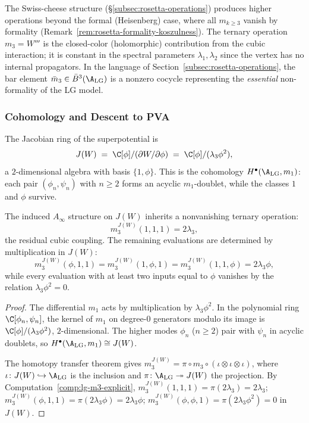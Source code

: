 \begin{remark}
\label{rem:lg-m3-rosetta}
The Swiss-cheese structure (\S\ref{subsec:rosetta-operations}) produces higher operations beyond the formal (Heisenberg) case, where all $m_{k \ge 3}$ vanish by formality (Remark~\ref{rem:rosetta-formality-koszulness}). The ternary operation $m_3 = W'''$ is the closed-color (holomorphic) contribution from the cubic interaction; it is constant in the spectral parameters $\lambda_1,\lambda_2$ since the vertex has no internal propagators. In the language of Section~\ref{subsec:rosetta-operations}, the bar element $\bar{m}_3 \in \bar{B}^3(\A_{\mathrm{LG}})$ is a nonzero cocycle representing the \emph{essential} non-formality of the LG model.
\end{remark}

\subsubsection{Cohomology and Descent to PVA}

\begin{proposition}
\label{prop:LG_cohomology}
The Jacobian ring of the superpotential is
\[
J(W) \;=\; \C[\phi]/(\partial W/\partial\phi)
 \;=\; \C[\phi]/(\lambda_3\phi^2),
\]
a $2$-dimensional algebra with basis $\{1,\phi\}$.
This is the cohomology $H^\bullet(\A_{\mathrm{LG}}, m_1)$: each pair
$(\phi_n,\psi_n)$ with $n \ge 2$ forms an acyclic $m_1$-doublet, while the
classes $1$ and $\phi$ survive.

The induced $A_\infty$ structure on $J(W)$ inherits a nonvanishing ternary
operation:
\begin{equation}\label{eq:lg-jacobian-m3}
 m_3^{J(W)}(1,1,1) = 2\lambda_3,
\end{equation}
the residual cubic coupling. The remaining evaluations are determined by
multiplication in $J(W)$:
\[
m_3^{J(W)}(\phi,1,1)=m_3^{J(W)}(1,\phi,1)=m_3^{J(W)}(1,1,\phi)
=2\lambda_3\phi,
\]
while every evaluation with at least two inputs equal to $\phi$ vanishes by
the relation $\lambda_3\phi^2=0$.
\end{proposition}

\begin{proof}
The differential $m_1$ acts by multiplication by $\lambda_3\phi^2$. In the polynomial ring $\C[\phi_n,\psi_n]$, the kernel of $m_1$ on degree-$0$ generators modulo its image is $\C[\phi]/(\lambda_3\phi^2)$, $2$-dimensional. The higher modes $\phi_n$ ($n \ge 2$) pair with $\psi_n$ in acyclic doublets, so $H^\bullet(\A_{\mathrm{LG}}, m_1) \cong J(W)$.

The homotopy transfer theorem gives $m_3^{J(W)} = \pi \circ m_3 \circ (\iota \otimes \iota \otimes \iota)$, where $\iota\colon J(W) \hookrightarrow \A_{\mathrm{LG}}$ is the inclusion and $\pi\colon \A_{\mathrm{LG}} \twoheadrightarrow J(W)$ the projection. By Computation~\ref{comp:lg-m3-explicit}, $m_3^{J(W)}(1,1,1) = \pi(2\lambda_3) = 2\lambda_3$; $m_3^{J(W)}(\phi,1,1) = \pi(2\lambda_3\phi) = 2\lambda_3\phi$; $m_3^{J(W)}(\phi,\phi,1) = \pi(2\lambda_3\phi^2) = 0$ in $J(W)$.
\end{proof}

